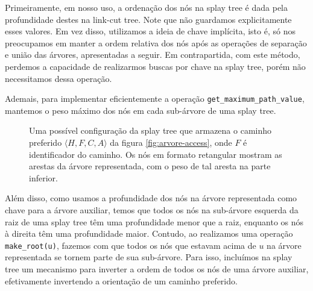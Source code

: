 Primeiramente, em nosso uso, a ordenação dos nós na splay tree é dada pela profundidade destes na link-cut tree. Note que não guardamos explicitamente esses valores. Em vez disso, utilizamos a ideia de chave implícita, isto é, só nos preocupamos em manter a ordem relativa dos nós após as operações de separação e união das árvores, apresentadas a seguir. Em contrapartida, com este método, perdemos a capacidade de realizarmos buscas por chave na splay tree, porém não necessitamos dessa operação.

Ademais, para implementar eficientemente a operação \texttt{get\_maximum\_path\_value}, mantemos o peso máximo dos nós em cada sub-árvore de uma splay tree.

\begin{figure}
    \centering
    \caption{Uma possível configuração da splay tree que armazena o caminho preferido $\langle H,F,C,A \rangle$ da figura \ref{fig:arvore-access}, onde $F$ é identificador do caminho. Os nós em formato retangular mostram as arestas da árvore representada, com o peso de tal aresta na parte inferior.}
    \label{fig:splay-path}
\end{figure}

Além disso, como usamos a profundidade dos nós na árvore representada como chave para a árvore auxiliar, temos que todos os nós na sub-árvore esquerda da raiz de uma splay tree têm uma profundidade menor que a raiz, enquanto os nós à direita têm uma profundidade maior. Contudo, ao realizamos uma operação \texttt{make\_root(u)}, fazemos com que todos os nós que estavam acima de $u$ na árvore representada se tornem parte de sua sub-árvore. Para isso, incluímos na splay tree um mecanismo para inverter a ordem de todos os nós de uma árvore auxiliar, efetivamente invertendo a orientação de um caminho preferido.

